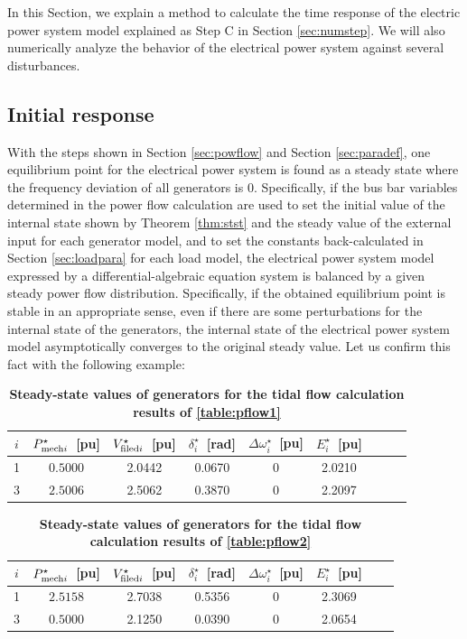 \documentclass[tombow,dvipdfmx]{corona-a5-1.1}
\begin{document}
In this Section, we explain a method to calculate the time response of the electric power system model explained as Step C in Section \ref{sec:numstep}.
We will also numerically analyze the behavior of the electrical power system against several disturbances.

\subsection{Initial response}

With the steps shown in Section \ref{sec:powflow} and Section \ref{sec:paradef}, one equilibrium point for the electrical power system is found as a steady state where the frequency deviation of all generators is 0.
Specifically, if the bus bar variables determined in the power flow calculation are used to set the initial value of the internal state shown by Theorem \ref{thm:stst} and the steady value of the external input for each generator model, and to set the constants back-calculated in Section \ref{sec:loadpara} for each load model, the electrical power system model expressed by a differential-algebraic equation system is balanced by a given steady power flow distribution.
Specifically, if the obtained equilibrium point is stable in an appropriate sense, even if there are some perturbations for the internal state of the generators, the internal state of the electrical power system model asymptotically converges to the original steady value.
Let us confirm this fact with the following example:

\begin{table}[h]
\medskip
 \caption{\textbf{Steady-state values of generators for the tidal flow calculation results of \ref{table:pflow1}}}
 \label{table:genst13a}
 \centering
  \begin{tabular}{ccccccccc}
   \hline
$i$ &  $P_{{\rm mech}i}^{\star}$~[pu] & $V_{{\rm filed}i}^{\star}$~[pu] & $\delta_i^{\star}$~[rad] & $\Delta \omega_i^{\star}$~[pu] & $E_i^{\star}$~[pu] \\
   \hline \hline
1 & $0.5000$ & 2.0442 & 0.0670 & 0 & 2.0210 \\
3 & $2.5006$ & 2.5062 & 0.3870 & 0 & 2.2097 \\
   \hline
  \end{tabular}
\end{table}

\begin{table}[h]
\medskip
 \caption{\textbf{Steady-state values of generators for the tidal flow calculation results of \ref{table:pflow2}}}
 \label{table:genst13b}
 \centering
  \begin{tabular}{cccccccc}
   \hline
$i$ &  $P_{{\rm mech}i}^{\star}$~[pu] & $V_{{\rm filed}i}^{\star}$~[pu] & $\delta_i^{\star}$~[rad] & $\Delta \omega_i^{\star}$~[pu] & $E_i^{\star}$~[pu] \\
   \hline \hline
1 & $2.5158$ & 2.7038 & 0.5356 & 0 & 2.3069 \\
3 & $0.5000$ & 2.1250 & 0.0390 & 0 & 2.0654 \\
   \hline
  \end{tabular}
\end{table}
\end{document}
